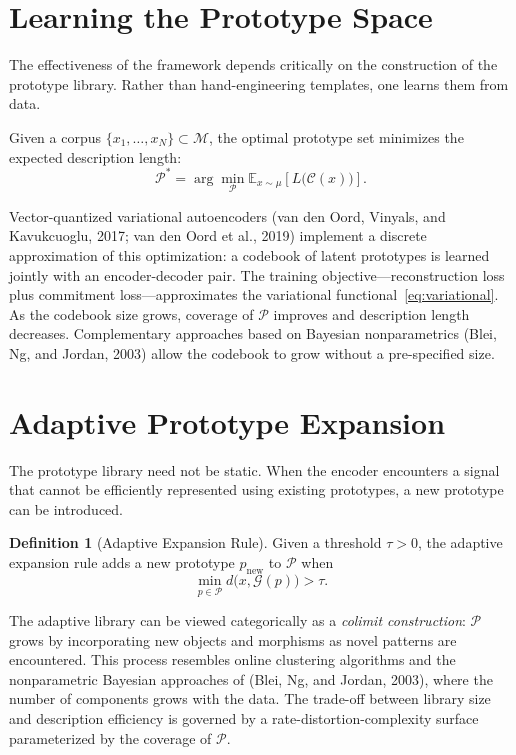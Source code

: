 \documentclass[11pt,a4paper]{article}
\theoremstyle{definition}
\newtheorem{definition}[theorem]{Definition}
\theoremstyle{remark}
\begin{document}
\section{Learning the Prototype Space}
\label{sec:learning}

The effectiveness of the framework depends critically on the construction of the prototype library. Rather than hand-engineering templates, one learns them from data.

Given a corpus $\{x_1, \dots, x_N\} \subset \mathcal{M}$, the optimal prototype set minimizes the expected description length:
\[
\mathcal{P}^* = \arg\min_{\mathcal{P}} \mathbb{E}_{x \sim \mu} \left[ L\big(\mathcal{C}(x)\big) \right].
\]

Vector-quantized variational autoencoders (van den Oord, Vinyals, and Kavukcuoglu, 2017; van den Oord et al., 2019) implement a discrete approximation of this optimization: a codebook of latent prototypes is learned jointly with an encoder-decoder pair. The training objective---reconstruction loss plus commitment loss---approximates the variational functional~\eqref{eq:variational}. As the codebook size grows, coverage of $\mathcal{P}$ improves and description length decreases. Complementary approaches based on Bayesian nonparametrics (Blei, Ng, and Jordan, 2003) allow the codebook to grow without a pre-specified size.

\section{Adaptive Prototype Expansion}
\label{sec:adaptive}

The prototype library need not be static. When the encoder encounters a signal that cannot be efficiently represented using existing prototypes, a new prototype can be introduced.

\begin{definition}[Adaptive Expansion Rule]
Given a threshold $\tau > 0$, the adaptive expansion rule adds a new prototype $p_{\mathrm{new}}$ to $\mathcal{P}$ when
\[
\min_{p \in \mathcal{P}} d\big(x, \mathcal{G}(p)\big) > \tau.
\]
\end{definition}

The adaptive library can be viewed categorically as a \emph{colimit construction}: $\mathcal{P}$ grows by incorporating new objects and morphisms as novel patterns are encountered. This process resembles online clustering algorithms and the nonparametric Bayesian approaches of (Blei, Ng, and Jordan, 2003), where the number of components grows with the data. The trade-off between library size and description efficiency is governed by a rate-distortion-complexity surface parameterized by the coverage of $\mathcal{P}$.
\end{document}
